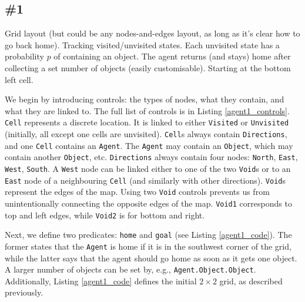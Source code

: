 \documentclass[runningheads]{llncs}
\begin{document}
\subsection{\#1}

Grid layout (but could be any nodes-and-edges layout, as long as it's clear how
to go back home). Tracking visited/unvisited states. Each unvisited state has a
probability $p$ of containing an object. The agent returns (and stays) home
after collecting a set number of objects (easily customisable). Starting at the
bottom left cell.



We begin by introducing controls: the types of nodes, what they contain, and
what they are linked to. The full list of controls is in Listing
\ref{agent1_controls}. \texttt{Cell} represents a discrete location. It is
linked to either \texttt{Visited} or \texttt{Unvisited} (initially, all except
one cells are unvisited). \texttt{Cell}s always contain
\texttt{Directions}, and one \texttt{Cell} contains an \texttt{Agent}. The
\texttt{Agent} may contain an \texttt{Object}, which may contain another
\texttt{Object}, etc. \texttt{Directions} always contain four nodes:
\texttt{North}, \texttt{East}, \texttt{West}, \texttt{South}. A \texttt{West}
node can be linked either to one of the two \texttt{Void}s or to an
\texttt{East} node of a neighbouring \texttt{Cell} (and similarly with other
directions). \texttt{Void}s represent the edges of the map. Using two
\texttt{Void} controls prevents us from unintentionally connecting the opposite
edges of the map. \texttt{Void1} corresponds to top and left edges, while
\texttt{Void2} is for bottom and right.



Next, we define two predicates: \texttt{home} and \texttt{goal} (see Listing
\ref{agent1_code}). The former states that the \texttt{Agent} is home
if it is in the southwest corner of the grid,
while the latter says that the agent should go home as soon as
it gets one object. A larger number of objects can be set by,
e.g., \texttt{Agent.Object.Object}. Additionally, Listing \ref{agent1_code}
defines the initial $2 \times 2$ grid, as described previously.


\end{document}
